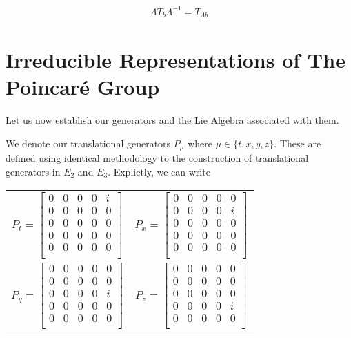 \documentclass[10pt]{ucthesis}
\begin{document}
\begin{equation}
\begin{aligned}
	\Lambda T_b \Lambda^{-1} = T_{\Lambda b}
\end{aligned}
\end{equation}

\section{Irreducible Representations of The Poincar\'e Group}

Let us now establish our generators and the Lie Algebra associated with them.

We denote our translational generators $P_\mu$ where $\mu\in\{t,x,y,z\}$. These are defined using identical methodology to the construction of translational generators in $E_2$ and $E_3$. Explictly, we can write 

\begin{center}
\begin{tabular}{cc}
	$P_t = \begin{bmatrix}
				0 & 0 & 0 & 0 & i \\
				0 & 0 & 0 & 0 & 0\\
				0 & 0 & 0 & 0 & 0\\
				0 & 0 & 0 & 0 & 0\\
				0 & 0 & 0 & 0 & 0\\
			\end{bmatrix}$ &
	$P_x = \begin{bmatrix}
				0 & 0 & 0 & 0 & 0 \\
				0 & 0 & 0 & 0 & i\\
				0 & 0 & 0 & 0 & 0\\
				0 & 0 & 0 & 0 & 0\\
				0 & 0 & 0 & 0 & 0\\
			\end{bmatrix}$ \\
	$P_y = \begin{bmatrix}
				0 & 0 & 0 & 0 & 0 \\
				0 & 0 & 0 & 0 & 0\\
				0 & 0 & 0 & 0 & i\\
				0 & 0 & 0 & 0 & 0\\
				0 & 0 & 0 & 0 & 0\\
			\end{bmatrix}$ &
	$P_z = \begin{bmatrix}
				0 & 0 & 0 & 0 & 0 \\
				0 & 0 & 0 & 0 & 0\\
				0 & 0 & 0 & 0 & 0\\
				0 & 0 & 0 & 0 & i\\
				0 & 0 & 0 & 0 & 0\\
			\end{bmatrix}$
\end{tabular}
\end{center}
\end{document}
